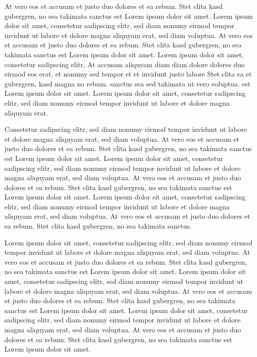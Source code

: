 At vero eos et accusam et justo duo dolores et ea rebum. Stet clita kasd gubergren, no sea takimata sanctus est Lorem ipsum dolor sit amet. Lorem ipsum dolor sit amet, consetetur sadipscing elitr, sed diam nonumy eirmod tempor invidunt ut labore et dolore magna aliquyam erat, sed diam voluptua. At vero eos et accusam et justo duo dolores et ea rebum. Stet clita kasd gubergren, no sea takimata sanctus est Lorem ipsum dolor sit amet. Lorem ipsum dolor sit amet, consetetur sadipscing elitr, At accusam aliquyam diam diam dolore dolores duo eirmod eos erat, et nonumy sed tempor et et invidunt justo labore Stet clita ea et gubergren, kasd magna no rebum. sanctus sea sed takimata ut vero voluptua. est Lorem ipsum dolor sit amet. Lorem ipsum dolor sit amet, consetetur sadipscing elitr, sed diam nonumy eirmod tempor invidunt ut labore et dolore magna aliquyam erat.

Consetetur sadipscing elitr, sed diam nonumy eirmod tempor invidunt ut labore et dolore magna aliquyam erat, sed diam voluptua. At vero eos et accusam et justo duo dolores et ea rebum. Stet clita kasd gubergren, no sea takimata sanctus est Lorem ipsum dolor sit amet. Lorem ipsum dolor sit amet, consetetur sadipscing elitr, sed diam nonumy eirmod tempor invidunt ut labore et dolore magna aliquyam erat, sed diam voluptua. At vero eos et accusam et justo duo dolores et ea rebum. Stet clita kasd gubergren, no sea takimata sanctus est Lorem ipsum dolor sit amet. Lorem ipsum dolor sit amet, consetetur sadipscing elitr, sed diam nonumy eirmod tempor invidunt ut labore et dolore magna aliquyam erat, sed diam voluptua. At vero eos et accusam et justo duo dolores et ea rebum. Stet clita kasd gubergren, no sea takimata sanctus.

Lorem ipsum dolor sit amet, consetetur sadipscing elitr, sed diam nonumy eirmod tempor invidunt ut labore et dolore magna aliquyam erat, sed diam voluptua. At vero eos et accusam et justo duo dolores et ea rebum. Stet clita kasd gubergren, no sea takimata sanctus est Lorem ipsum dolor sit amet. Lorem ipsum dolor sit amet, consetetur sadipscing elitr, sed diam nonumy eirmod tempor invidunt ut labore et dolore magna aliquyam erat, sed diam voluptua. At vero eos et accusam et justo duo dolores et ea rebum. Stet clita kasd gubergren, no sea takimata sanctus est Lorem ipsum dolor sit amet. Lorem ipsum dolor sit amet, consetetur sadipscing elitr, sed diam nonumy eirmod tempor invidunt ut labore et dolore magna aliquyam erat, sed diam voluptua. At vero eos et accusam et justo duo dolores et ea rebum. Stet clita kasd gubergren, no sea takimata sanctus est Lorem ipsum dolor sit amet.

